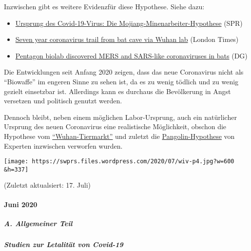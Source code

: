 Inzwischen gibt es weitere Evidenzfür diese Hypothese. Siehe dazu:

\begin{itemize}
\tightlist
\item
  \href{https://swprs.org/ursprung-des-covid-19-virus-die-mojiang-minenarbeiter-hypothese/}{Ursprung
  des Covid-19-Virus: Die Mojiang-Minenarbeiter-Hypothese} (SPR)
\item
  \href{https://www.thetimes.co.uk/article/seven-year-covid-trail-revealed-l5vxt7jqp}{Seven
  year coronavirus trail from bat cave via Wuhan lab} (London Times)
\item
  \href{https://armswatch.com/project-g-2101-pentagon-biolab-discovered-mers-and-sars-like-coronaviruses-in-bats/}{Pentagon
  biolab discovered MERS and SARS-like coronaviruses in bats} (DG)
\end{itemize}

Die Entwicklungen seit Anfang 2020 zeigen, dass das neue Coronavirus
nicht als ``Biowaffe'' im engeren Sinne zu sehen ist, da es zu wenig
tödlich und zu wenig gezielt einsetzbar ist. Allerdings kann es durchaus
die Bevölkerung in Angst versetzen und politisch genutzt werden.

Dennoch bleibt, neben einem möglichen Labor-Ursprung, auch ein
natürlicher Ursprung des neuen Coronavirus eine realistische
Möglichkeit, obschon die Hypothese vom
\href{https://thebulletin.org/2020/06/did-the-sars-cov-2-virus-arise-from-a-bat-coronavirus-research-program-in-a-chinese-laboratory-very-possibly}{``Wuhan-Tiermarkt''}
und zuletzt die
\href{https://www.news-medical.net/news/20200708/Research-sheds-doubt-on-the-Pangolin-link-to-SARS-CoV-2.aspx}{Pangolin-Hypothese}
von Experten inzwischen verworfen wurden.

\texttt{[image: https://swprs.files.wordpress.com/2020/07/wiv-p4.jpg?w=600\\\&h=337]}

(Zuletzt aktualsiert: 17. Juli)

\hypertarget{juni-2020}{%
\paragraph{Juni 2020}\label{juni-2020}}

\hypertarget{a-allgemeiner-teil-1}{%
\subparagraph{\texorpdfstring{\textbf{A. Allgemeiner
Teil}}{A. Allgemeiner Teil}}\label{a-allgemeiner-teil-1}}

\hypertarget{studien-zur-letalituxe4t-von-covid-19}{%
\subparagraph{\texorpdfstring{\textbf{Studien zur Letalität von
Covid-19}}{Studien zur Letalität von Covid-19}}\label{studien-zur-letalituxe4t-von-covid-19}}

